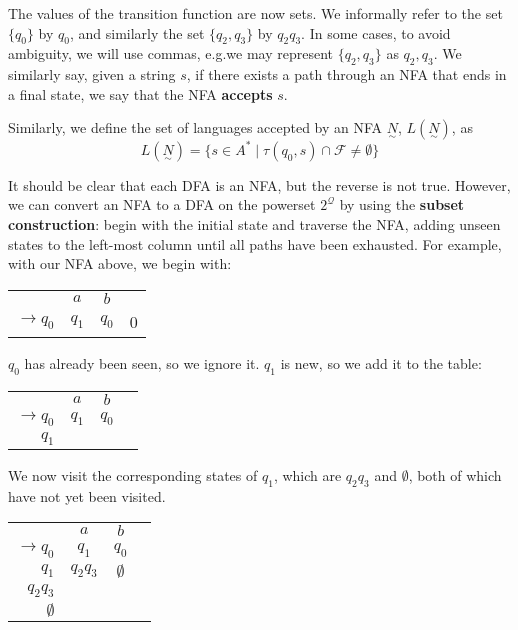 The values of the transition function are now sets. We informally refer to the set \( \{q_0\} \) by \(q_0\), and similarly the set \( \{q_2, q_3\} \) by \(q_2q_3\). In some cases, to avoid ambiguity, we will use commas, e.g.\@ we may represent \( \{q_2, q_3\} \) as \(q_2,q_3\). We similarly say, given a string \(s\), if there exists a path through an NFA that ends in a final state, we say that the NFA \textbf{accepts} \(s\).

Similarly, we define the set of languages accepted by an NFA \(\underset{\sim}{N}\), \(L(\underset{\sim}{N})\), as \[L(\underset{\sim}{N}) = \{s\in A^* \mid \tau(q_0, s)\cap\mathcal{F}\neq\emptyset \} \]

It should be clear that each DFA is an NFA, but the reverse is not true. However, we can convert an NFA to a DFA on the powerset \(2^{\mathcal{Q}}\) by using the \textbf{subset construction}: begin with the initial state and traverse the NFA, adding unseen states to the left-most column until all paths have been exhausted. For example, with our NFA above, we begin with:

\begin{center}\begin{tabular}{r c c r}
         & \(a\) & \(b\) & \\\cmidrule{2-3}
    \(\to q_0\) & \(q_1\) & \(q_0\) & 0 \\
\end{tabular}\end{center}

\(q_0\) has already been seen, so we ignore it. \(q_1\) is new, so we add it to the table:

\begin{center}\begin{tabular}{r c c r}
         & \(a\) & \(b\) & \\\cmidrule{2-3}
    \(\to q_0\) & \(q_1\) & \(q_0\) &  \\
          \(q_1\) &       &       & 
\end{tabular}\end{center}

We now visit the corresponding states of \(q_1\), which are \(q_2q_3\) and \(\emptyset \), both of which have not yet been visited. 

\begin{center}\begin{tabular}{r c c r}
         & \(a\) & \(b\) & \\\cmidrule{2-3}
    \(\to q_0\) & \(q_1\) & \(q_0\) &  \\
          \(q_1\) & \(q_2q_3\) & \(\emptyset \) & \\
          \(q_2q_3\) & & & \\
          \(\emptyset \) & & &
\end{tabular}\end{center}

